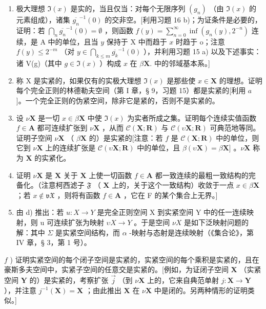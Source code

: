\begin{enumerate}
\def\labelenumi{\alph{enumi})}
\item
  极大理想 \(\Im(x)\) 是实的，当且仅当：对每个无限序列 \((g_n)\) （由 \(\Im(x)\) 的元素组成），诸集 \(\overline{g_n}^{-1}(0)\) 的交非空。{[}利用习题 16 b)；为证条件是必要的，证明：若 \(\bigcap_{n}\overline{g_{n}}^{-1}(0) = \emptyset\) ，则函数 \(f(y) = \sum_{n = 0}^{\infty}\inf (g_n(y),2^{-n})\) 连续，是 A 中的单位，且当 \(y\) 保持于 X 中而趋于 \(x\) 时趋于 o；注意 \(f(y)\leqslant 2^{-m}\) （对 \(y\in \bigcap_{k\leqslant m}\overline{g_k}^{-1}(0)\) ），并利用习题 15 a) 以及下述事实：诸 V(g)（其中 \(g\in \Im(x)\) ）构成 \(x\) 在 \(\beta \mathbf{X}.\) 中的邻域基本系。{]}
\item
  称 X 是实紧的，如果仅有的实极大理想 \(\Im(x)\) 是那些使 \(x \in \mathbf{X}\) 的理想。证明每个完全正则的林德勒夫空间（第 I 章，§ 9，习题 15）都是实紧的{[}利用 \(a\) {]}。一个完全正则的伪紧空间，除非它是紧的，否则不是实紧的。
\item
  设 \(\nu\mathbf{X}\) 是一切 \(x\in \beta \mathbf{X}\) 中使 \(\Im (x)\) 为实者所成之集。证明每个连续实值函数 \(f\in \mathbf{A}\) 都可连续扩张到 \(\nu\mathbf{X}\) ，从而 \(\mathcal{C}(\mathbf{X};\mathbf{R})\) 与 \(\mathcal{C}(\upsilon\mathbf{X};\mathbf{R})\) 可典范地等同。证明子空间 \(\nu\mathbf{X}\) （ \(\beta\mathbf{X}\) 的）是实紧的{[}注意：若 \(f\) 是 \(\mathcal{C}(\mathbf{X};\mathbf{R})\) 中的单位，则它到 \(\nu\mathbf{X}\) 上的连续扩张是 \(\mathcal{C}(\upsilon\mathbf{X};\mathbf{R})\) 中的单位，且 \(\beta(\upsilon\mathbf{X}) = \beta\mathbf{X}]\) 。\(\nu\mathbf{X}\) 称为 \(\mathbf{X}\) 的实紧化。
\item
  证明 \(\nu\mathbf{X}\) 是 \(\mathbf{X}\) 关于 \(\mathbf{X}\) 上使一切函数 \(f\in \mathbf{A}\) 都一致连续的最粗一致结构的完备化。（注意柯西滤子 \(\mathfrak{F}\) （ \(\mathbf{X}\) 上的，关于这个一致结构）收敛于一点 \(x\in \beta \mathbf{X}\) ；若 \(x\notin \mathfrak{vX}\) ，则将有函数 \(f\in \mathbf{A}\) ，它在 F 的某个集合上无界。{]}
\item
  由 d) 推出：若 \(u: X \to Y\) 是完全正则空间 X 到实紧空间 Y 中的任一连续映射，则 u 可连续扩张为映射 \(\upsilon X \to Y\) 。于是空间 \(\nu X\) 是如下泛映射问题的解：其中 \(\Sigma\) 是实紧空间结构，而 \(\alpha\) -映射与态射是连续映射（《集合论》，第 IV 章，§ 3，第 1 号）。
\end{enumerate}

\(f\) ) 证明实紧空间的每个闭子空间是实紧的，实紧空间的每个乘积是实紧的，且在豪斯多夫空间中，实紧子空间的任意交是实紧的。{[}例如，为证闭子空间 \(\mathbf{X}\) （实紧空间 \(\mathbf{Y}\) 的）是实紧的，考察扩张 \(\vec{j}\) （到 \(\nu\mathbf{X}\) 上的，它来自典范单射 \(j:\mathbf{X}\to\mathbf{Y}\) ），并注意 \(j^{-1}(\mathbf{X})=\mathbf{X}\) ；由此推出 \(\mathbf{X}\) 在 \(\nu\mathbf{X}\) 中是闭的。另两种情形的证明类似。{]}

